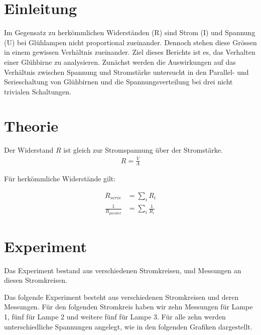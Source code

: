 \documentclass[12pt, a4paper, twoside]{article}
\begin{document}
\maketitlepage

\section{Einleitung}
Im Gegensatz zu herkömmlichen Widerständen (R) sind Strom (I) und Spannung (U) bei Glühlampen nicht proportional zueinander. Dennoch stehen diese Grössen in einem gewissen Verhältnis zueinander. Ziel dieses Berichts ist es, das Verhalten einer Glühbirne zu analysieren. Zunächst werden die Auswirkungen auf das Verhältnis zwischen Spannung und Stromstärke untersucht in den Parallel- und Serieschaltung von Glühbirnen und die Spannungsverteilung bei drei nicht trivialen Schaltungen.


\section{Theorie}
Der Widerstand $R$ ist gleich zur Stromspannung über der Stromstärke.
\begin{align*}
  R = \frac{V}{A}
\end{align*}

Für herkömmliche Widerstände gilt:

\begin{align*}
  R_{serie}              & = \sum_{i}R_i            \\
  \frac{1}{R_{parallel}} & = \sum_{i} \frac{1}{R_i}
\end{align*}
\cite{FoTa, S.176}

\section{Experiment}
Das Experiment bestand aus verschiedenen Stromkreisen, und Messungen an diesen Stromkreisen.
\par
Das folgende Experiment besteht aus verschiedenen Stromkreisen und deren Messungen. 
Für den folgenden Stromkreis haben wir zehn Messungen für Lampe 1, fünf für Lampe 2 und weitere fünf für Lampe 3. Für alle zehn werden unterschiedliche Spannungen angelegt, wie in den folgenden Grafiken dargestellt. \\


\end{document}
